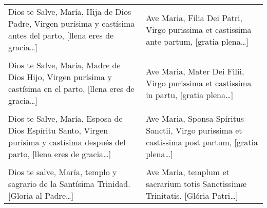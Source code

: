 \documentclass[./00_main.tex]{subfiles}
\begin{document}
\label{final-prayer}

\begin{longtable} { p{} p{} }
    Dios te Salve, María, Hija de Dios Padre, Virgen purísima y castísima antes del parto, [llena eres de gracia{\ldots}]
        &
    Ave Maria, Filia Dei Patri, Virgo purissima et castissima ante partum, [gratia plena{\ldots}]\\\\
    Dios te Salve, María, Madre de Dios Hijo, Virgen purísima y castísima en el parto, [llena eres de gracia{\ldots}]
        &
    Ave Maria, Mater Dei Filii, Virgo purissima et castissima in partu, [gratia plena{\ldots}]\\\\
    Dios te Salve, María, Esposa de Dios Espíritu Santo, Virgen purísima y castísima después del parto, [llena eres de gracia{\ldots}]
        &
    Ave Maria, Sponsa Spíritus Sanctii, Virgo purissima et castissima post partum, [gratia plena{\ldots}]\\\\      
    Dios te salve, María, templo y sagrario de la Santísima Trinidad. [Gloria al Padre{\ldots}]
        &
    Ave Maria, templum et sacrarium totis Sanctissimæ Trinitatis. [Glória Patri{\ldots}]
\end{longtable}
\end{document}
